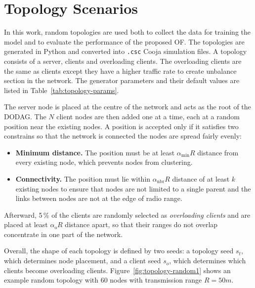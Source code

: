 \section{Topology Scenarios}
In this work, random topologies are used both to collect the data for
training the model and to evaluate the performance of the proposed OF.
The topologies are generated in Python and converted into \texttt{.csc}
Cooja simulation files. A topology consists of a server, clients and
overloading clients. The overloading clients are the same as clients
except they have a higher traffic rate to create unbalance section in
the network. The generator parameters and
their default values are listed in
Table~\ref{tab:topology-params}.

The server node is placed at the centre of the network and acts as the
root of the DODAG. The $N$ client nodes
are then added one at a time, each at a random position near the
existing nodes. A position is accepted only if it satisfies two constrains so that the network is connected the nodes are spread fairly evenly:
\begin{itemize}
    \item \textbf{Minimum distance.} The position must be at least
        $\alpha_{\mathrm{min}}R$ distance from every existing node,
        which prevents nodes from clustering.
    \item \textbf{Connectivity.} The position must lie within
        $\alpha_{\mathrm{nbr}}R$ distance of at least $k$ existing
        nodes to ensure that nodes are not limited to a single parent and the
        links between nodes are not at the edge of radio range.
\end{itemize}

Afterward, 5\,\% of the clients are randomly selected as
\emph{overloading clients} and are
placed at least $\alpha_{\mathrm{o}}R$ distance
apart, so that their ranges do not overlap concentrate in one part of
the network.

Overall, the shape of each topology is defined by two seeds: a topology
seed $s_t$, which determines node placement, and a client seed $s_o$,
which determines which clients become overloading clients.
Figure~\ref{fig:topology-random1} shows an example random topology
with 60 nodes with transmission range $R = 50m$.

